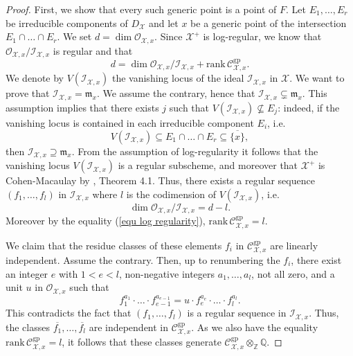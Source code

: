 \documentclass{amsart}%
\numberwithin{equation}{subsection}
\theoremstyle{plain2}
\theoremstyle{definition2}
\theoremstyle{stepstyle}
\theoremstyle{point}
\theoremstyle{subpoint}
\newcommand{\Z}{\ensuremath{\mathbb{Z}}}
\newcommand{\Q}{\ensuremath{\mathbb{Q}}}
\newcommand{\cX}{\ensuremath{\mathscr{X}}}
\newcommand{\caM}{\ensuremath{\mathcal{M}}}
\newcommand{\caC}{\ensuremath{\mathcal{C}}}
\newcommand{\caO}{\ensuremath{\mathcal{O}}}
\newcommand{\caI}{\ensuremath{\mathcal{I}}}
\newcommand{\gp}{\mathrm{gp}}
\begin{document}
\begin{proof}
First, we show that every such generic point is a point of $F$. Let $E_1,\ldots,E_r$ be irreducible components of $D_{\cX}$ and let $x$ be a generic point of the intersection $E_1\cap\ldots\cap E_r$. We set $d=\dim \mathcal{O}_{\cX,x}$. Since $\cX^+$ is log-regular, we know that $\mathcal{O}_{\cX,x}/\mathcal{I}_{\cX,x}$ is regular and that \begin{equation} \label{equ log regularity}
d=\dim \mathcal{O}_{\cX,x}/\mathcal{I}_{\cX,x}+\mathrm{rank}\,\mathcal{C}^{\gp}_{\cX,x}.\end{equation} We denote by $V(\caI_{\cX,x})$ the vanishing locus of the ideal $\caI_{\cX,x}$ in $\cX$.
We want to prove that $\caI_{\cX,x}= \mathfrak{m}_x$. We assume the contrary, hence that $\caI_{\cX,x} \subsetneq \mathfrak{m}_x$. This assumption implies that there exists $j$ such that $V(\caI_{\cX,x}) \nsubseteq E_j$: indeed, if the vanishing locus is contained in each irreducible component $E_i$, i.e. $$V(\caI_{\cX,x}) \subseteq E_1 \cap \ldots \cap E_r \subseteq \overline{\{x\}},$$ then $\caI_{\cX,x} \supseteq \mathfrak{m}_x$. From the assumption of log-regularity it follows that the vanishing locus $V(\caI_{\cX,x})$ is a regular subscheme, and moreover that $\cX^+$ is Cohen-Macaulay by \cite{Kato1994a}, Theorem 4.1. Thus, there exists a regular sequence $(f_1,\ldots,f_l)$ in $\caI_{\cX,x}$ where $l$ is the codimension of $V(\caI_{\cX,x})$, i.e. $$ \dim \mathcal{O}_{\cX,x}/\mathcal{I}_{\cX,x} = d-l.$$ Moreover by the equality (\ref{equ log regularity}), $\mathrm{rank}\,\mathcal{C}^{\gp}_{\cX,x} = l$.
%
 
We claim that the residue classes of these elements $f_i$ in $\mathcal{C}_{\cX,x}^{\gp}$ are linearly independent. Assume the contrary. Then, up to renumbering the $f_i$, there exist an  integer $e$ with $1< e< l$, non-negative integers $a_1,\ldots,a_l$, not all zero, and a unit $u$ in $\mathcal{O}_{\cX,x}$ such that $$f_1^{a_1}\cdot \ldots \cdot f_{e-1}^{a_{e-1}}=u\cdot f_e^{a_e}\cdot \ldots \cdot f_l^{a_l}.$$ This contradicts the fact that $(f_1,\ldots,f_l)$ is a regular sequence in $\mathcal{I}_{\cX,x}$. Thus, the classes $\overline{f_1}, \ldots,\overline{f_l}$ are independent in $\caC_{\cX,x}^\gp$. As we also have the equality $\mathrm{rank}\,\mathcal{C}^{\gp}_{\cX,x}=l$, it follows that these classes generate $\caC_{\cX,x}^\gp \otimes_{\Z} \Q$.


\end{proof}
\end{document}
